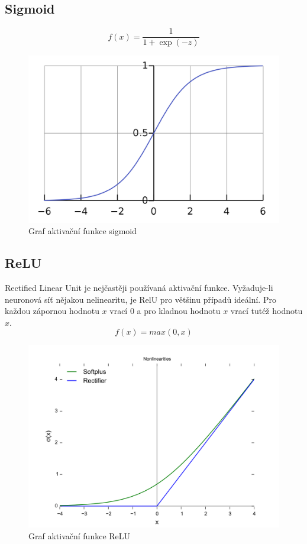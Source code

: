 \subsection{Sigmoid}
\begin{equation}
  f(x) = \frac{1}{1+\exp(-z)}
\end{equation}
\begin{figure}[H]
    \centering
    \includegraphics[scale=0.2]{obrazky-figures/sigmoid.png}
    \caption{\label{fig:sigmoid}Graf aktivační funkce sigmoid}
\end{figure}


\subsection{ReLU}
Rectified Linear Unit je nejčastěji používaná aktivační funkce. Vyžaduje-li neuronová síť nějakou nelinearitu, je RelU pro většinu případů ideální. Pro každou zápornou hodnotu $x$ vrací $0$ a pro kladnou hodnotu $x$ vrací tutéž hodnotu $x$.
\begin{equation}
   f(x)=max(0,x)
\end{equation}
\begin{figure}[H]
    \centering
    \includegraphics[scale=0.2]{obrazky-figures/ReLU.png}
    \caption{\label{fig:relu}Graf aktivační funkce ReLU}
\end{figure}


